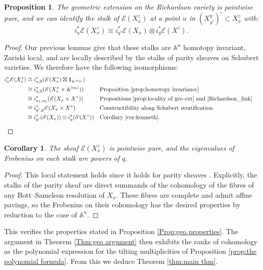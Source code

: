 \documentclass[11pt]{article}
\newtheorem{cor}[thm]{Corollary}
\newtheorem{prop}[thm]{Proposition}
\theoremstyle{remark}
\theoremstyle{definition}
\begin{document}
\begin{prop}\label{prop:stalks agree}
The geometric extension on the Richardson variety is pointwise pure, and we can identify the stalk of $\mathscr{E}(X^z_x)$ at a point $u$ in $(X^y_{y'})^\circ\subset X^z_x$ with: \[i_u^*\mathscr{E}(X^z_x)\cong i_{y'}^*\mathscr{E}(X_x)\otimes i_y^*\mathscr{E}(X^z).\]
\end{prop}

\begin{proof}
Our previous lemmas give that these stalks are $\mathbb{A}^n$ homotopy invariant, Zariski local, and are locally described by the stalks of parity sheaves on Schubert varieties. We therefore have the following isomorphisms:
\begin{align*}
i^*_u\mathscr{E}({X^z_x})&\cong i^*_{u,0}(\mathscr{E}(X^z_x) \boxtimes \mathbf{1}_{\mathbb{A}^{|w_0|}})\\
&\cong i^*_{u,0}(\mathscr{E}(X_z^x\times \mathbb{A}^{|w_0|}))&&\text{Proposition \ref{prop:homotopy invariance}}\\
&\cong i^*_{u_1,u_2}(\mathscr{E}(X_x\times X^z))&&\text{Propositions \ref{prop:locality of geo ext} and \ref{Richardson_link}}\\
&\cong i^*_{y',y}\mathscr{E}(X_x\times X^z)&&\text{Constructibility along Schubert stratification}\\
&\cong i^*_{y'}(\mathscr{E}(X_x))\otimes i^*_y(\mathscr{E}(X^z))&&\text{Corollary \ref{cor:kunneth}.}
\end{align*}
\end{proof}

\begin{cor}
The sheaf $\mathscr{E}(X^z_x)$ is pointwise pure, and the eigenvalues of Frobenius on each stalk are powers of $q$.
\end{cor}

\begin{proof}
This local statement holds since it holds for parity sheaves \cite[1.3.5]{JMW14}. Explicitly, the stalks of the parity sheaf are direct summands of the cohomology of the fibres of any Bott--Samelson resolution of $X_x$. These fibres are complete and admit affine pavings, so the Frobenius on their cohomology has the desired properties by reduction to the case of $\mathbb{A}^n$.
\end{proof}

This verifies the properties stated in Proposition \ref{Prop:geo properties}.
The argument in Theorem \ref{Thm:geo argument} then exhibits the ranks of cohomology as the polynomial expression for the tilting multiplicities of Proposition \ref{prop:the polynomial formula}. From this we deduce Theorem \ref{thm:main thm}.
\end{document}
